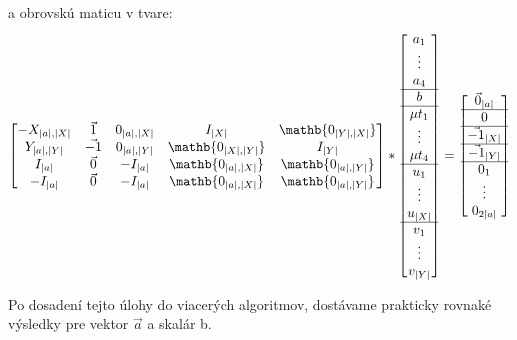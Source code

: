 \documentclass{article}
\begin{document}
a obrovskú maticu v tvare:
\[
\begin{bmatrix}
-X_{|a|,|X|} & \Vec{1} & 0_{|a|,|X|} & I_{|X|} & \mathb{0_{|Y|,|X|}} \\
Y_{|a|,|Y|} & \Vec{-1} & 0_{|a|,|Y|} & \mathb{0_{|X|,|Y|}} & I_{|Y|} \\
I_{|a|} & \Vec{0} & -I_{|a|} & \mathb{0_{|a|,|X|}} & \mathb{0_{|a|,|Y|}} \\ 
-I_{|a|} & \Vec{0} & -I_{|a|} & \mathb{0_{|a|,|X|}} & \mathb{0_{|a|,|Y|}} \\
\end{bmatrix}
 * 
 \begin{bmatrix}
a_1 \\ \vdots \\ a_4 \\ \hline
 b \\ \hline
 \mu t_1 \\ \vdots \\ \mu t_4 \\ \hline
 u_1 \\ \vdots \\ u_{|X|} \\ \hline
 v_1 \\ \vdots \\ v_{|Y|}
\end{bmatrix}
=
\begin{bmatrix}
\Vec{0}_{|a|} \\ \hline 0 \\ \hline \Vec{-1}_{|X|} \\ \hline \Vec{-1}_{|Y|} \\ \hline 0_1 \\ \vdots \\ 0_{2|a|}
\end{bmatrix}\]

Po dosadení tejto úlohy do viacerých algoritmov, dostávame prakticky rovnaké výsledky pre vektor $\Vec{a}$ a skalár b.
\end{document}
